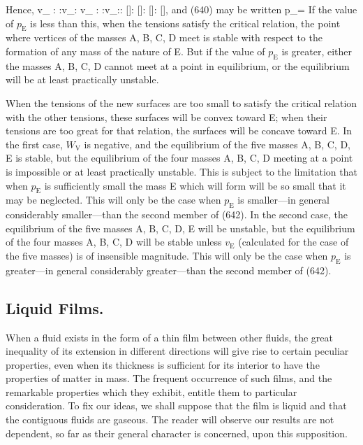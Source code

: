 \documentclass[12pt]{article}
\begin{document}
Hence,
\eqs v_ : :v_: v_ : :v_:: []: []: []: [],    \label{641}\eqe
and (640) may be written
\eqs p_=   \label{642}\eqe
If the value of $p_\text{E}$ is less than this, when the tensions satisfy the critical relation, the point where vertices of the masses A, B, C, D meet is stable with respect to the formation of any mass of the nature of E. But if the value of $p_\text{E}$ is greater, either the masses A, B, C, D cannot meet at a point in equilibrium, or the equilibrium will be at least practically unstable.

When the tensions of the new surfaces are too small to satisfy the critical relation with the other tensions, these surfaces will be convex toward E; when their tensions are too great for that relation, the surfaces will be concave toward E. In the first case, $W_\text{V}$ is negative, and the equilibrium of the five masses A, B, C, D, E is stable, but the equilibrium of the four masses A, B, C, D meeting at a point is impossible or at least practically unstable.  This is subject to the limitation that when $p_\text{E}$ is sufficiently small the mass E which will form will be so small that it may be neglected. This will only be the case when $p_\text{E}$ is smaller---in general considerably smaller---than the second member of (642). In the second case, the equilibrium of the five masses A, B, C, D, E will be unstable, but the equilibrium of the four masses A, B, C, D will be stable unless $v_\text{E}$ (calculated for the case of the five masses) is of insensible magnitude. This will only be the case when $p_\text{E}$ is greater---in general considerably greater---than the second member of (642).
\subsection{Liquid Films.}
When a fluid exists in the form of a thin film between other fluids, the great inequality of its extension in different directions will give rise to certain peculiar properties, even when its thickness is sufficient for its interior to have the properties of matter in mass. The frequent occurrence of such films, and the remarkable properties which they exhibit, entitle them to particular consideration. To fix our ideas, we shall suppose that the film is liquid and that the contiguous fluids are gaseous. The reader will observe our results are not dependent, so far as their general character is concerned, upon this supposition.
\end{document}
